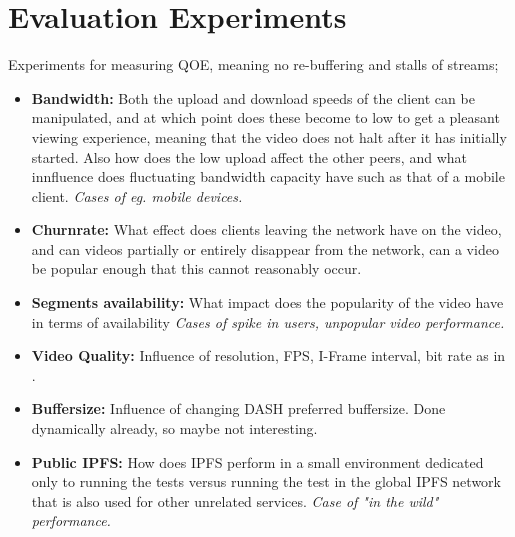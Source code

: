 \section{Evaluation Experiments}
Experiments for measuring \ac{QOE}, meaning no re-buffering and stalls of streams;
\begin{itemize}
    \item \textbf{Bandwidth:}
    Both the upload and download speeds of the client can be manipulated, and at which point does these become to low to get a pleasant viewing experience, meaning that the video does not halt after it has initially started. Also how does the low upload affect the other peers, and what innfluence does fluctuating bandwidth capacity have such as that of a mobile client.
    \textit{Cases of eg. mobile devices.}
    \item \textbf{Churnrate:}
    What effect does clients leaving the network have on the video, and can videos partially or entirely disappear from the network, can a video be popular enough that this cannot reasonably occur.
    \item \textbf{Segments availability:}
    What impact does the popularity of the video have in terms of availability
    \textit{Cases of spike in users, unpopular video performance. }
    \item \textbf{Video Quality:}
    Influence of resolution, \acs{FPS}, I-Frame interval, bit rate as in \cite{aloman2015performance}.
    \item \textbf{Buffersize:}
    Influence of changing DASH preferred buffersize. Done dynamically already, so maybe not interesting. 
    \item \textbf{Public IPFS:}
    How does IPFS perform in a small environment dedicated only to running the tests versus running the test in the global IPFS network that is also used for other unrelated services.
    \textit{Case of "in the wild" performance.} 
\end{itemize}
